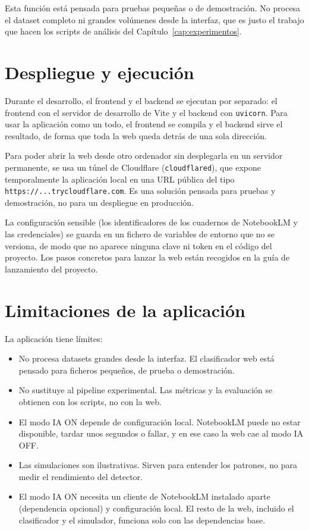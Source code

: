 Esta función está pensada para pruebas pequeñas o de demostración. No procesa el dataset completo ni grandes volúmenes desde la interfaz, que es justo el trabajo que hacen los scripts de análisis del Capítulo~\ref{cap:experimentos}.

\section{Despliegue y ejecución}
\label{sec:web_despliegue}

Durante el desarrollo, el frontend y el backend se ejecutan por separado: el frontend con el servidor de desarrollo de Vite y el backend con \texttt{uvicorn}. Para usar la aplicación como un todo, el frontend se compila y el backend sirve el resultado, de forma que toda la web queda detrás de una sola dirección.

Para poder abrir la web desde otro ordenador sin desplegarla en un servidor permanente, se usa un túnel de Cloudflare (\texttt{cloudflared}), que expone temporalmente la aplicación local en una URL pública del tipo \texttt{https://...trycloudflare.com}. Es una solución pensada para pruebas y demostración, no para un despliegue en producción.

La configuración sensible (los identificadores de los cuadernos de NotebookLM y las credenciales) se guarda en un fichero de variables de entorno que no se versiona, de modo que no aparece ninguna clave ni token en el código del proyecto. Los pasos concretos para lanzar la web están recogidos en la guía de lanzamiento del proyecto.

\section{Limitaciones de la aplicación}
\label{sec:web_limitaciones}

La aplicación tiene límites:

\begin{itemize}
  \item No procesa datasets grandes desde la interfaz. El clasificador web está pensado para ficheros pequeños, de prueba o demostración.
  \item No sustituye al pipeline experimental. Las métricas y la evaluación se obtienen con los scripts, no con la web.
  \item El modo IA ON depende de configuración local. NotebookLM puede no estar disponible, tardar unos segundos o fallar, y en ese caso la web cae al modo IA OFF.
  \item Las simulaciones son ilustrativas. Sirven para entender los patrones, no para medir el rendimiento del detector.
  \item El modo IA ON necesita un cliente de NotebookLM instalado aparte (dependencia opcional) y configuración local. El resto de la web, incluido el clasificador y el simulador, funciona solo con las dependencias base.
\end{itemize}

